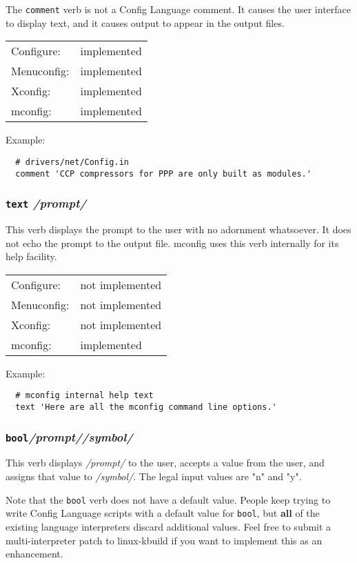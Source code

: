 The \texttt{comment} verb is not a Config Language comment.  It causes the
user interface to display text, and it causes output to appear in the
output files.

\begin{tabular}{ll}
Configure:  &implemented\\
Menuconfig: &implemented\\
Xconfig:    &implemented\\
mconfig:    &implemented\\
\end{tabular}

Example:
{\small\begin{verbatim}
  # drivers/net/Config.in
  comment 'CCP compressors for PPP are only built as modules.'
\end{verbatim}}


\subsubsection{\texttt{text} \quad\textit{/prompt/}}

This verb displays the prompt to the user with no adornment whatsoever.
It does not echo the prompt to the output file.  mconfig uses this verb
internally for its help facility.

\begin{tabular}{ll}
Configure:  &not implemented\\
Menuconfig: &not implemented\\
Xconfig:    &not implemented\\
mconfig:    &implemented\\
\end{tabular}

Example:
{\small\begin{verbatim}
  # mconfig internal help text
  text 'Here are all the mconfig command line options.'
\end{verbatim}}



\subsubsection{\texttt{bool}\quad \textit{/prompt/}\quad\textit{/symbol/}}

This verb displays \textit{/prompt/} to the user, accepts a value from the user,
and assigns that value to \textit{/symbol/}.  The legal input values are "n" and
"y".

Note that the \texttt{bool} verb does not have a default value.  People keep
trying to write Config Language scripts with a default value for \texttt{bool},
but \textbf{all} of the existing language interpreters discard additional values.
Feel free to submit a multi-interpreter patch to linux-kbuild if you
want to implement this as an enhancement.

